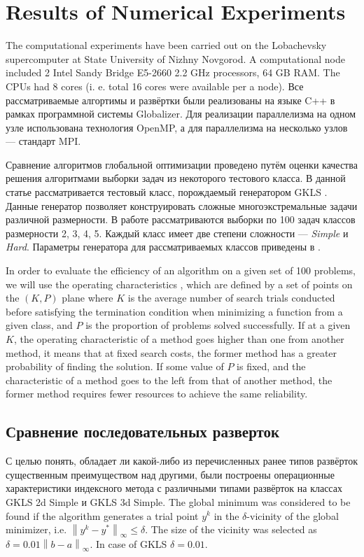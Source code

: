 \documentclass[runningheads]{llncs}
\begin{document}
\section{Results of Numerical Experiments}
The computational experiments have been carried out on the Lobachevsky supercomputer at
State University of Nizhny Novgorod. A computational node included 2 Intel
Sandy Bridge E5-2660 2.2 GHz processors, 64 GB RAM. The CPUs had 8 cores (i. e. total 16 cores
were available per a node). Все рассматриваемые алгортимы и развёртки были реализованы на языке C++ в рамках программной системы Globalizer\cite{globalizerSystem}.
Для реализации параллелизма на одном узле использована технология OpenMP, а для параллелизма на несколько узлов --- стандарт MPI.

Сравнение алгоритмов глобальной оптимизации проведено путём оценки качества решения алгоритмами выборки задач из некоторого тестового класса.
В данной статье рассматривается тестовый класс, порождаемый генератором GKLS \cite{Gaviano2003}. Данные генератор позволяет конструировать сложные многоэкстремальные задачи различной размерности. В работе рассматриваются выборки по 100 задач классов размерности 2, 3, 4, 5. Каждый класс имеет две степени сложности --- \textit{Simple} и \textit{Hard}. Параметры генератора для рассматриваемых классов приведены в \cite{Gaviano2003}.

In order to evaluate the efficiency of an algorithm on a given set of 100 problems, we will use the
operating characteristics \cite{grishaginClass}, which are defined by a set of
points on the \((K, P)\) plane where \(K\) is the average number of search trials
conducted before satisfying the termination condition when minimizing a function
from a given class, and \(P\) is the proportion of problems solved successfully.
If at a given \(K\), the operating characteristic of a method goes higher than one
from another method, it means that at fixed search costs, the former method has a
greater probability of finding the solution. If some value of \(P\) is fixed, and the
characteristic of a method goes to the left from that of another method, the former
method requires fewer resources to achieve the same reliability.

\subsection{Сравнение последовательных разверток}
\label{sec:seq_comp}
С целью понять, обладает ли какой-либо из перечисленных ранее типов развёрток существенным преимуществом над другими, были построены операционные характеристики индексного метода с различными типами развёрток на классах GKLS 2d Simple и GKLS 3d Simple. The global minimum was considered to be found if the algorithm generates a trial point $y^k$ in the $\delta$-vicinity of the global minimizer, i.e. $\left\|y^k-y^\ast\right\|_\infty\leq\delta$. The size of the vicinity was selected as $\delta = 0.01\left\|b-a\right\|_\infty$. In case of GKLS $\delta=0.01$.
\end{document}
